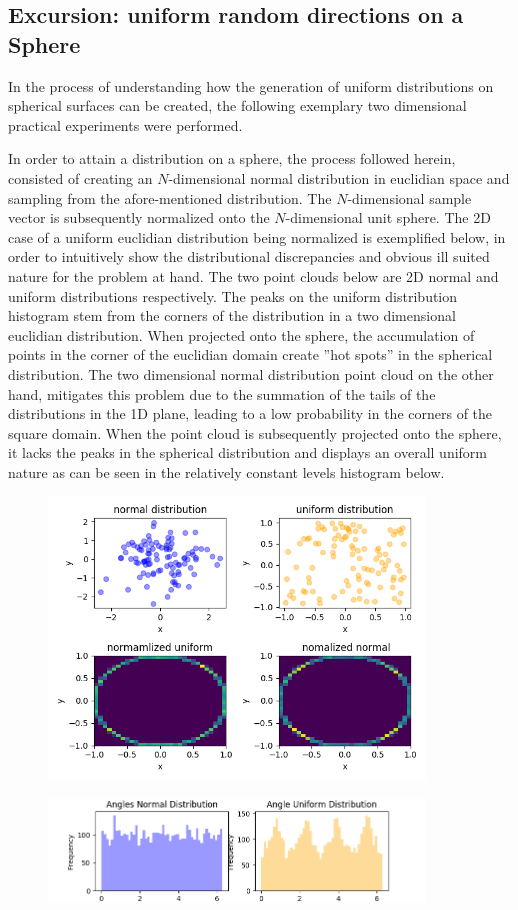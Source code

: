 \subsection{Excursion: uniform random directions on a Sphere}\label{uniformPoints}

In the process of understanding how the generation of uniform distributions on
spherical surfaces can be created, the following exemplary two dimensional practical
experiments were performed.

In order to attain a distribution on a sphere, the process followed herein,
consisted of creating an $N$-dimensional normal distribution in euclidian space and
sampling from the afore-mentioned distribution.  The $N$-dimensional sample vector
is subsequently normalized onto the $N$-dimensional unit sphere.
The 2D case of a uniform
euclidian distribution being normalized is exemplified below, in order to intuitively
show the distributional discrepancies and obvious ill suited nature for the problem
at hand.  The two point clouds below are 2D normal and uniform distributions
respectively.  The peaks on the uniform distribution histogram stem from the corners
of the distribution in a two dimensional euclidian distribution.  When projected onto
the sphere, the accumulation of points in the corner of the euclidian domain create
''hot spots'' in the spherical distribution.  The two dimensional normal
distribution point cloud on the other hand, mitigates this problem due to the summation
of the tails of the distributions in the 1D plane, leading to a low probability
in the corners of the square domain.  When the point cloud  is subsequently projected
onto the sphere, it lacks the peaks in the  spherical distribution and displays an
overall uniform nature as can be seen in the relatively constant levels  histogram below.
\begin{figure}
\begin{center}
\includegraphics[width=10.0cm]{styles/distributions} \label{plot:distributions}
  \caption{}
  \includegraphics[width=10.0cm]{styles/histograms} \label{plot:historam}
    \caption{}
\end{center}
\end{figure}



